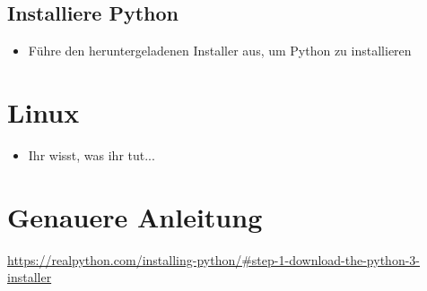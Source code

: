 \documentclass[accentcolor=3c,colorbacktitle,12pt]{tudaexercise}
\begin{document}
\subsection*{Installiere Python}
\begin{itemize}
	\item Führe den heruntergeladenen Installer aus, um Python zu installieren
\end{itemize}

\section*{Linux}
\begin{itemize}
	\item Ihr wisst, was ihr tut...
\end{itemize}

\section*{Genauere Anleitung}
 \url{https://realpython.com/installing-python/#step-1-download-the-python-3-installer}
\end{document}
